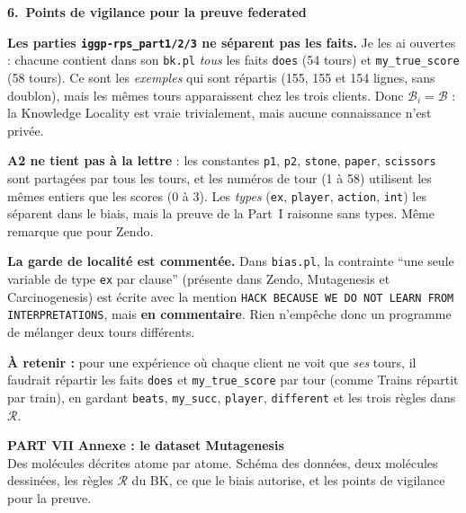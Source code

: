 \documentclass[10pt]{article}
\newcommand{\titrebox}[2]{\needspace{10\baselineskip}\vspace{8pt}
  \begin{tcolorbox}[colback=marine, colframe=marine, arc=0pt, boxrule=0pt,
    top=4pt, bottom=4pt, left=8pt]
  \color{white}\Large\bfseries #1.~#2
  \end{tcolorbox}\vspace{2pt}}
\newcommand{\ce}[1]{\begin{pourquoi}\textbf{\textcolor{marine}{À retenir :}} #1\end{pourquoi}}
\newcommand{\partie}[3]{\newpage
  \begin{tcolorbox}[colback=pastel, colframe=pastel, arc=0pt, boxrule=0pt,
    top=8pt, bottom=8pt, left=10pt]
  {\fontsize{26}{28}\selectfont\bfseries\textcolor{marine}{PART #1}}\quad
  {\Large\bfseries\textcolor{encre}{#2}}\\[2pt]{\small #3}
  \end{tcolorbox}\vspace{4pt}}
\begin{document}
\titrebox{6}{Points de vigilance pour la preuve federated}
\begin{piege}
\textbf{Les parties \texttt{iggp-rps\_part1/2/3} ne séparent pas les faits.} Je les ai ouvertes : chacune contient dans son \texttt{bk.pl} \emph{tous} les faits \texttt{does} (54 tours) et \texttt{my\_true\_score} (58 tours). Ce sont les \emph{exemples} qui sont répartis (155, 155 et 154 lignes, sans doublon), mais les mêmes tours apparaissent chez les trois clients. Donc $\mathcal{B}_i=\mathcal{B}$ : la Knowledge Locality est vraie trivialement, mais aucune connaissance n'est privée.
\end{piege}
\begin{piege}
\textbf{A2 ne tient pas à la lettre} : les constantes \texttt{p1}, \texttt{p2}, \texttt{stone}, \texttt{paper}, \texttt{scissors} sont partagées par tous les tours, et les numéros de tour (1 à 58) utilisent les mêmes entiers que les scores (0 à 3). Les \emph{types} (\texttt{ex}, \texttt{player}, \texttt{action}, \texttt{int}) les séparent dans le biais, mais la preuve de la Part~I raisonne sans types. Même remarque que pour Zendo.
\end{piege}
\begin{piege}
\textbf{La garde de localité est commentée.} Dans \texttt{bias.pl}, la contrainte ``une seule variable de type \texttt{ex} par clause'' (présente dans Zendo, Mutagenesis et Carcinogenesis) est écrite avec la mention \texttt{HACK BECAUSE WE DO NOT LEARN FROM INTERPRETATIONS}, mais \textbf{en commentaire}. Rien n'empêche donc un programme de mélanger deux tours différents.
\end{piege}
\ce{pour une expérience où chaque client ne voit que \emph{ses} tours, il faudrait répartir les faits \texttt{does} et \texttt{my\_true\_score} par tour (comme Trains répartit par train), en gardant \texttt{beats}, \texttt{my\_succ}, \texttt{player}, \texttt{different} et les trois règles dans $\mathcal{R}$.}

\partie{VII}{Annexe : le dataset Mutagenesis}{Des molécules décrites atome par atome. Schéma des données, deux molécules dessinées, les règles $\mathcal{R}$ du BK, ce que le biais autorise, et les points de vigilance pour la preuve.}
\end{document}
